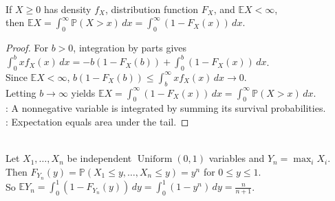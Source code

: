 \begin{proposition} \label{prop:tail-integral-formula-nonnegative} \\
If $X\geq0$ has density $f_X$, distribution function $F_X$, and $\mathbb{E}X<\infty$,\\
then $\mathbb{E}X=\int_0^\infty\mathbb{P}(X>x)\,dx=\int_0^\infty(1-F_X(x))\,dx$.
\begin{proof}
For $b>0$, integration by parts gives $\int_0^bxf_X(x)\,dx=-b(1-F_X(b))+\int_0^b(1-F_X(x))\,dx$.\\
Since $\mathbb{E}X<\infty$, $b(1-F_X(b))\leq\int_b^\infty xf_X(x)\,dx\to0$.\\
Letting $b\to\infty$ yields $\mathbb{E}X=\int_0^\infty(1-F_X(x))\,dx=\int_0^\infty\mathbb{P}(X>x)\,dx$.\\
: A nonnegative variable is integrated by summing its survival probabilities.\\
: Expectation equals area under the tail.
\end{proof}
\end{proposition}

\begin{example} \label{ex:maximum-uniform-expectation} \\
Let $X_1,\ldots,X_n$ be independent $\operatorname{Uniform}(0,1)$ variables and $Y_n=\max_iX_i$.\\
Then $F_{Y_n}(y)=\mathbb{P}(X_1\leq y,\ldots,X_n\leq y)=y^n$ for $0\leq y\leq1$.\\
So $\mathbb{E}Y_n=\int_0^1(1-F_{Y_n}(y))\,dy=\int_0^1(1-y^n)\,dy=\frac{n}{n+1}$.
\end{example}

